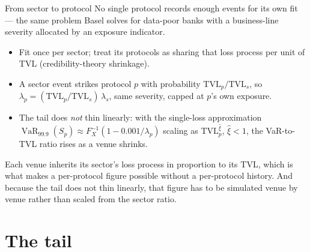 \documentclass[10pt,xcolor=x11names,aspectratio=169]{beamer}
\newcommand{\VaR}{\operatorname{VaR}}
\begin{document}
\begin{frame}{From sector to protocol}
  No single protocol records enough events for its own fit --- the same
  problem Basel solves for data-poor banks with a business-line severity
  allocated by an exposure indicator.
  \begin{itemize}
    \item Fit once per sector; treat its protocols as sharing that loss
          process per unit of TVL (credibility-theory shrinkage).
    \item A sector event strikes protocol $p$ with probability
          $\text{TVL}_p/\text{TVL}_s$, so
          $\lambda_p = (\text{TVL}_p/\text{TVL}_s)\,\lambda_s$, same severity,
          capped at $p$'s own exposure.
    \item The tail does \emph{not} thin linearly: with the single-loss
          approximation
          $\VaR_{99.9}(S_p)\approx F_X^{-1}(1-0.001/\lambda_p)$ scaling as
          $\text{TVL}_p^{\hat\xi}$, $\hat\xi<1$, the VaR-to-TVL ratio
          rises as a venue shrinks.
  \end{itemize}
  \begin{takeaway}
    Each venue inherits its sector's loss process in proportion to its TVL,
    which is what makes a per-protocol figure possible without a per-protocol
    history. And because the tail does not thin linearly, that figure has to
    be simulated venue by venue rather than scaled from the sector ratio.
  \end{takeaway}
\end{frame}

\section{The tail}
\end{document}
